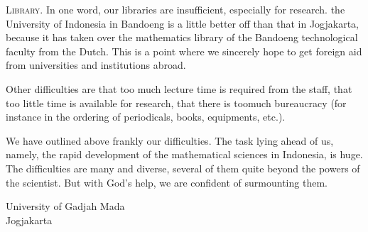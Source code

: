 \bigskip
\noindent
\textsc{Library.} In one word, our libraries are insufficient,
especially for research. the University of Indonesia in Bandoeng is a
little better off than that in Jogjakarta, because it has taken over
the mathematics library of the Bandoeng technological faculty from the
Dutch. This is a point where we sincerely hope to get foreign aid from
universities and institutions abroad. 

Other difficulties are that too much lecture time is required from the
staff, that too little time is available for research, that there is
too\pageoriginale much bureaucracy (for instance in the ordering of
periodicals, books, equipments, etc.).

We have outlined above frankly our difficulties. The task lying ahead
of us, namely, the rapid development of the mathematical sciences in
Indonesia, is huge. The difficulties are many and diverse, several of
them quite beyond the powers of the scientist. But with God's help, we
are confident of surmounting them.


\bigskip
\bigskip

\noindent
{\fontsize{9pt}{11pt}\selectfont
University of Gadjah Mada\\
Jogjakarta}\relax
